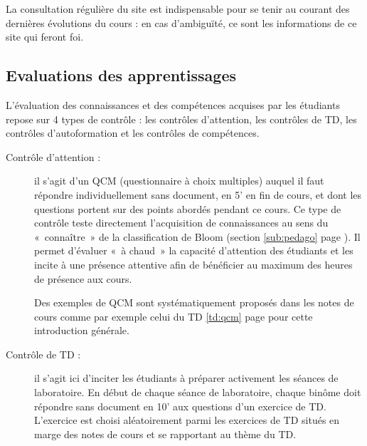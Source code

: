 La consultation régulière du site est indispensable pour
se tenir au courant des dernières évolutions du cours : en cas d'ambiguïté,
ce sont les informations de ce site qui feront foi.


\subsection{Evaluations des apprentissages}\label{sub:evaluation}
L'évaluation des connaissances et des compétences acquises par les étudiants
repose sur 4 types de contrôle : les contrôles d'attention, les contrôles de TD, 
les contrôles d'autoformation et les contrôles de compétences.
\begin{description}
\item[Contrôle d'attention :] \mbox{}
	il s'agit d'un QCM (questionnaire à choix multiples) 
	auquel il faut répondre individuellement
	sans document, en 5' en fin de cours, et dont les questions portent 
	sur des points abordés pendant ce cours. Ce type de contrôle teste directement
	l'acquisition de connaissances au sens du «~connaître~» de la classification de
	Bloom (section \ref{sub:pedago} page \pageref{sub:pedago}).
	Il permet d'évaluer «~à chaud~» la capacité d'attention des étudiants et les incite 
	à une présence attentive afin de bénéficier au maximum des heures de présence 
	aux cours. 	
	
	Des exemples de QCM sont systématiquement proposés dans les notes de cours
	comme par exemple celui du TD \ref{td:qcm} page \pageref{td:qcm} pour cette introduction générale.
\item[Contrôle de TD :]\mbox{}
	il s'agit ici d'inciter les étudiants à préparer
	activement les séances de laboratoire. En début de chaque séance de 
	laboratoire, chaque binôme doit répondre sans document en 10' aux questions
	d'un exercice de TD.
	L'exercice est choisi aléatoirement parmi les exercices de TD situés en marge
	des notes de cours et se rapportant au thème du TD. 


\end{description}
